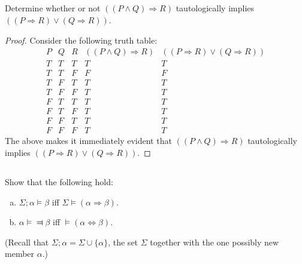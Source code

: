 \documentclass{report}
\begin{document}
\subsection{}%

  Determine whether or not $((P \land Q) \Rightarrow R)$ tautologically implies
    $((P \Rightarrow R) \lor (Q \Rightarrow R))$.

  \begin{proof}
    Consider the following truth table:
      $$\begin{array}{s|s|s|e|e}
        P & Q & R &
          ((P \land Q) \Rightarrow R) &
          ((P \Rightarrow R) \lor (Q \Rightarrow R)) \\
        \hline
        T & T & T & T & T \\
        T & T & F & F & F \\
        T & F & T & T & T \\
        T & F & F & T & T \\
        F & T & T & T & T \\
        F & T & F & T & T \\
        F & F & T & T & T \\
        F & F & F & T & T
      \end{array}$$
    The above makes it immediately evident that
      $((P \land Q) \Rightarrow R)$ tautologically implies
      $((P \Rightarrow R) \lor (Q \Rightarrow R))$.
  \end{proof}

\subsection{}%

  Show that the following hold:
    \begin{enumerate}[(a)]
      \item $\Sigma; \alpha \vDash \beta$ iff
        $\Sigma \vDash (\alpha \Rightarrow \beta)$.
      \item $\alpha \vDash \Dashv \beta$ iff
        $\vDash (\alpha \Leftrightarrow \beta)$.
    \end{enumerate}
  (Recall that $\Sigma; \alpha = \Sigma \cup \{\alpha\}$, the set $\Sigma$
    together with the one possibly new member $\alpha$.)
\end{document}

